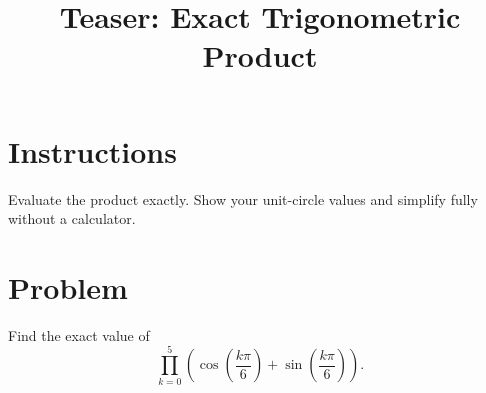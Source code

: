 \documentclass[12pt]{article}
\title{Teaser: Exact Trigonometric Product}
\author{}
\date{}
\begin{document}
\maketitle

\section*{Instructions}
Evaluate the product exactly. Show your unit-circle values and simplify fully without a calculator.

\section*{Problem}
Find the exact value of
\[
  \prod_{k=0}^{5}
  \left(
    \cos\left(\frac{k\pi}{6}\right)
    +
    \sin\left(\frac{k\pi}{6}\right)
  \right).
\]
\end{document}
